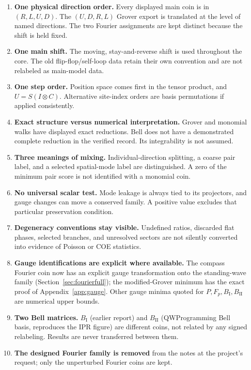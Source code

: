 \documentclass[11pt,a4paper,oneside]{report}
\newcommand{\Id}{I}
\numberwithin{equation}{chapter}
\begin{document}
\begin{enumerate}
\item \textbf{One physical direction order.} Every displayed main
coin is in \((R,L,U,D)\). The \((U,D,R,L)\) Grover export is translated
at the level of named directions. The two Fourier assignments are
kept distinct because the shift is held fixed.
\item \textbf{One main shift.} The moving, stay-and-reverse shift is
used throughout the core. The old flip-flop/self-loop data retain
their own convention and are not relabeled as main-model data.
\item \textbf{One step order.} Position space comes first in the
tensor product, and \(U=S(\Id\otimes C)\). Alternative site-index
orders are basis permutations if applied consistently.
\item \textbf{Exact structure versus numerical interpretation.}
Grover and monomial walks have displayed exact reductions. Bell does
not have a demonstrated complete reduction in the verified record.
Its integrability is not assumed.
\item \textbf{Three meanings of mixing.} Individual-direction
splitting, a coarse pair label, and a selected spatial-mode label are
distinguished. A zero of the minimum pair score is not identified
with a monomial coin.
\item \textbf{No universal scalar test.} Mode leakage is always tied
to its projectors, and gauge changes can move a conserved family.
A positive value excludes that particular preservation condition.
\item \textbf{Degeneracy conventions stay visible.} Undefined
ratios, discarded flat phases, selected branches, and unresolved
sectors are not silently converted into evidence of Poisson or COE
statistics.
\item \textbf{Gauge identifications are explicit where available.}
The compass Fourier coin now has an explicit gauge transformation onto the
standing-wave family (Section~\ref{sec:fourierfull}); the modified-Grover
minimum has the exact proof of Appendix~\ref{app:gauge}. Other gauge
minima quoted for \(P,F_p,B_{\mathrm I},B_{\mathrm{II}}\) are numerical
upper bounds.
\item \textbf{Two Bell matrices.} \(B_{\mathrm I}\) (earlier report) and
\(B_{\mathrm{II}}\) (QWProgramming Bell basis, reproduces the IPR figure)
are different coins, not related by any signed relabeling. Results are
never transferred between them.
\item \textbf{The designed Fourier family is removed} from the notes at
the project's request; only the unperturbed Fourier coins are kept.
\end{enumerate}
\end{document}
